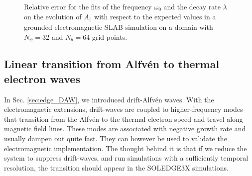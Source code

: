\begin{figure}[H]
\begin{subfigure}[b]{0.45\textwidth}
		\label{fig:electromagneticSLAB_errorGrounded_kPerp_fixed}
	\end{subfigure}
	\caption{Relative error for the fits of the frequency $\omega_0$ and the decay rate $\lambda$ on the evolution of $A_\parallel$ with respect to the expected values in a grounded electromagnetic SLAB simulation on a domain with $N_\psi=32$ and $N_\theta=64$ grid points.}
	\label{fig:electromagneticSLAB_errorGrounded}
\end{figure}






% 
%
%


\subsection{Linear transition from Alfvén to thermal electron waves}

In Sec. \ref{sec:edge_DAW}, we introduced drift-Alfvén waves. With the electromagnetic extensions, drift-waves are coupled to higher-frequency modes that transition from the Alfvén to the thermal electron speed and travel along magnetic field lines. These modes are associated with negative growth rate and usually dampen out quite fast. They can however be used to validate the electromagnetic implementation. The thought behind it is that if we reduce the system to suppress drift-waves, and run simulations with a sufficiently temporal resolution, the transition should appear in the SOLEDGE3X simulations. \\

